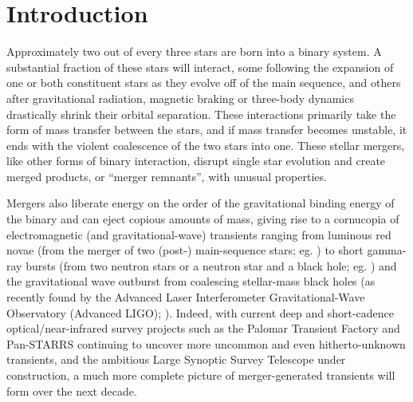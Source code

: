 \chapter{Introduction}


Approximately two out of every three stars are born into a binary system.  A substantial fraction of these stars will interact, some following the expansion of one or both constituent stars as they evolve off of the main sequence, and others after gravitational radiation, magnetic braking or three-body dynamics drastically shrink their orbital separation.  These interactions primarily take the form of mass transfer between the stars, and if mass transfer becomes unstable, it ends with the violent coalescence of the two stars into one.  These stellar mergers, like other forms of binary interaction, disrupt single star evolution and create merged products, or ``merger remnants'', with unusual properties.


Mergers also liberate energy on the order of the gravitational binding energy of the binary and can eject copious amounts of mass, giving rise to a cornucopia of electromagnetic (and gravitational-wave) transients ranging from luminous red novae (from the merger of two (post-) main-sequence stars; eg. \citealt{tyle+11, nandil14}) to short gamma-ray bursts (from two neutron stars or a neutron star and a black hole; eg. \citealt{ross15}) and the gravitational wave outburst from coalescing stellar-mass black holes (as recently found by the Advanced Laser Interferometer Gravitational-Wave Observatory (Advanced LIGO); \citealt{ligo16}).  Indeed, with current deep and short-cadence optical/near-infrared survey projects such as the Palomar Transient Factory \citep{rau+09} and Pan-STARRS \citep{kais+10} continuing to uncover more uncommon and even hitherto-unknown transients, and the ambitious Large Synoptic Survey Telescope \citep{lsst09} under construction, a much more complete picture of merger-generated transients will form over the next decade.

